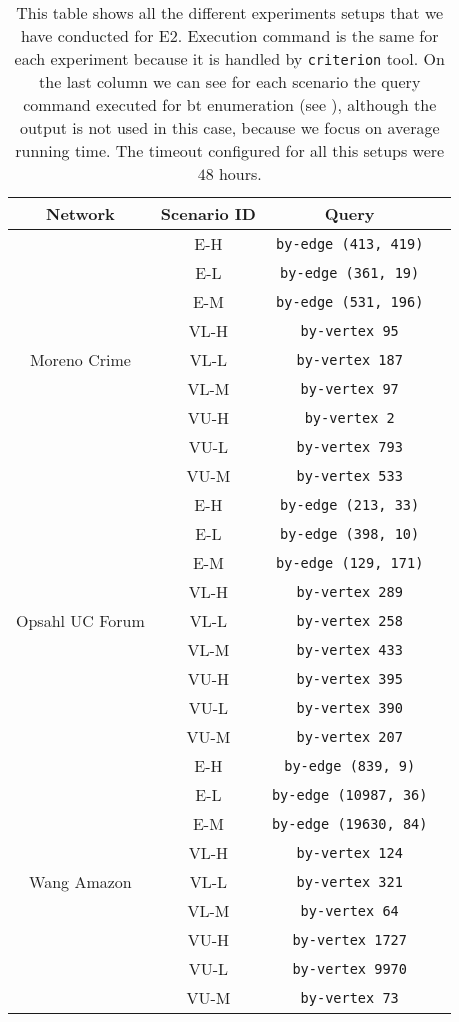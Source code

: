 \begin{table}[H]
\centering
\begin{tabular}{|c|c|c|c|}
  \hline
  \textbf{Network} & \textbf{Scenario ID} & \textbf{Query}\\
  \hline
  \multirow{9}{*}{Moreno Crime} & E-H & \texttt{by-edge (413, 419)}\\
  & E-L & \texttt{by-edge (361, 19)}\\
  & E-M & \texttt{by-edge (531, 196)}\\
  & VL-H & \texttt{by-vertex 95}\\
  & VL-L & \texttt{by-vertex 187}\\
  & VL-M & \texttt{by-vertex 97}\\
  & VU-H & \texttt{by-vertex 2}\\
  & VU-L & \texttt{by-vertex 793}\\
  & VU-M & \texttt{by-vertex 533}\\
  \hline
  \multirow{9}{*}{Opsahl UC Forum} & E-H & \texttt{by-edge (213, 33)}\\
  & E-L & \texttt{by-edge (398, 10)}\\
  & E-M & \texttt{by-edge (129, 171)}\\
  & VL-H & \texttt{by-vertex 289}\\
  & VL-L & \texttt{by-vertex 258}\\
  & VL-M & \texttt{by-vertex 433}\\
  & VU-H & \texttt{by-vertex 395}\\
  & VU-L & \texttt{by-vertex 390}\\
  & VU-M & \texttt{by-vertex 207}\\
  \hline
  \multirow{9}{*}{Wang Amazon} & E-H & \texttt{by-edge (839, 9)}\\
  & E-L & \texttt{by-edge (10987, 36)}\\
  & E-M & \texttt{by-edge (19630, 84)}\\
  & VL-H & \texttt{by-vertex 124}\\
  & VL-L & \texttt{by-vertex 321}\\
  & VL-M & \texttt{by-vertex 64}\\
  & VU-H & \texttt{by-vertex 1727}\\
  & VU-L & \texttt{by-vertex 9970}\\
  & VU-M & \texttt{by-vertex 73}\\
  \hline
\end{tabular}
\caption[{[EE] E2 Procedure}]{This table shows all the different experiments setups that we have conducted for E2. Execution command is the same for each experiment because it is handled by \texttt{criterion} tool. On the last column we can see for each scenario the query command executed for \acrshort{bt} enumeration (see ), although the output is not used in this case, because we focus on average running time. The timeout configured for all this setups were $48$ hours.}
\label{table:e2:def}
\end{table}

